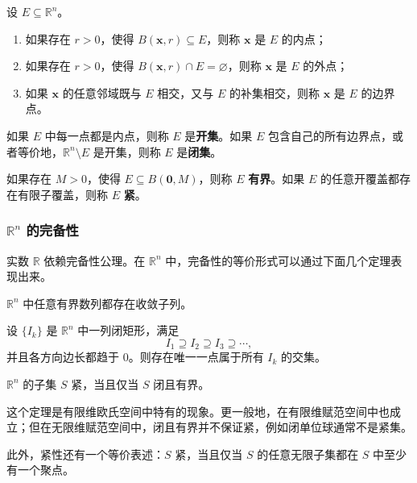 \begin{definition}[内点、外点与边界点]
设 $E\subseteq\mathbb{R}^n$。
\begin{enumerate}
    \item 如果存在 $r>0$，使得 $B(\mathbf{x},r)\subseteq E$，则称 $\mathbf{x}$ 是 $E$ 的内点；
    \item 如果存在 $r>0$，使得 $B(\mathbf{x},r)\cap E=\varnothing$，则称 $\mathbf{x}$ 是 $E$ 的外点；
    \item 如果 $\mathbf{x}$ 的任意邻域既与 $E$ 相交，又与 $E$ 的补集相交，则称 $\mathbf{x}$ 是 $E$ 的边界点。
\end{enumerate}
\end{definition}

\begin{definition}[开集与闭集]
如果 $E$ 中每一点都是内点，则称 $E$ 是\textbf{开集}。如果 $E$ 包含自己的所有边界点，或者等价地，$\mathbb{R}^n\setminus E$ 是开集，则称 $E$ 是\textbf{闭集}。
\end{definition}

\begin{definition}[有界集与紧集]
如果存在 $M>0$，使得 $E\subseteq B(\mathbf{0},M)$，则称 $E$ \textbf{有界}。如果 $E$ 的任意开覆盖都存在有限子覆盖，则称 $E$ \textbf{紧}。
\end{definition}

\subsubsection{\texorpdfstring{$\mathbb{R}^n$}{R^n} 的完备性}

实数 $\mathbb{R}$ 依赖完备性公理。在 $\mathbb{R}^n$ 中，完备性的等价形式可以通过下面几个定理表现出来。

\begin{theorem}
$\mathbb{R}^n$ 中任意有界数列都存在收敛子列。
\end{theorem}

\begin{theorem}[闭矩形套定理]
设 $\{I_k\}$ 是 $\mathbb{R}^n$ 中一列闭矩形，满足
\[
    I_1\supseteq I_2\supseteq I_3\supseteq\cdots,
\]
并且各方向边长都趋于 $0$。则存在唯一一点属于所有 $I_k$ 的交集。
\end{theorem}

\begin{theorem}
$\mathbb{R}^n$ 的子集 $S$ 紧，当且仅当 $S$ 闭且有界。
\end{theorem}

\begin{remark}
这个定理是有限维欧氏空间中特有的现象。更一般地，在有限维赋范空间中也成立；但在无限维赋范空间中，闭且有界并不保证紧，例如闭单位球通常不是紧集。

此外，紧性还有一个等价表述：$S$ 紧，当且仅当 $S$ 的任意无限子集都在 $S$ 中至少有一个聚点。
\end{remark}

